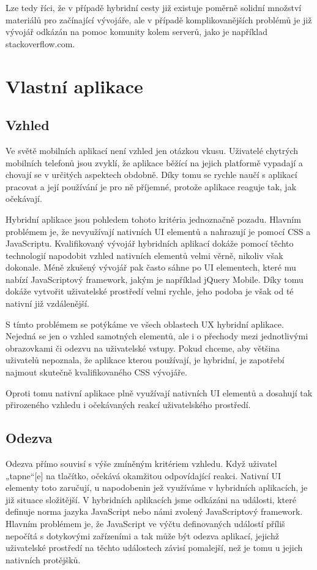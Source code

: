 Lze tedy říci, že v případě hybridní cesty již existuje poměrně solidní množství materiálů pro začínající vývojáře, ale v případě komplikovanějších problémů je již vývojář odkázán na pomoc komunity kolem serverů, jako je například stackoverflow.com.

\section{Vlastní aplikace}
\subsection{Vzhled}
Ve světě mobilních aplikací není vzhled jen otázkou vkusu. Uživatelé chytrých mobilních telefonů jsou zvyklí, že aplikace běžící na jejich platformě vypadají a chovají se v určitých aspektech obdobně. Díky tomu se rychle naučí s aplikací pracovat a její používání je pro ně příjemné, protože aplikace reaguje tak, jak očekávají.

Hybridní aplikace jsou pohledem tohoto kritéria jednoznačně pozadu. Hlavním problémem je, že nevyužívají nativních UI elementů a nahrazují je pomocí CSS a JavaScriptu. Kvalifikovaný vývojář hybridních aplikací dokáže pomocí těchto technologií napodobit vzhled nativních elementů velmi věrně, nikoliv však dokonale. Méně zkušený vývojář pak často sáhne po UI elementech, které mu nabízí JavaScriptový framework, jakým je například jQuery Mobile. Díky tomu dokáže vytvořit uživatelské prostředí velmi rychle, jeho podoba je však od té nativní již vzdálenější.

S tímto problémem se potýkáme ve všech oblastech UX hybridní aplikace. Nejedná se jen o vzhled samotných elementů, ale i o přechody mezi jednotlivými obrazovkami či odezvu na uživatelské vstupy. Pokud chceme, aby většina uživatelů nepoznala, že aplikace kterou používají, je hybridní, je zapotřebí najmout skutečně kvalifikovaného CSS vývojáře.

Oproti tomu nativní aplikace plně využívají nativních UI elementů a dosahují tak přirozeného vzhledu i očekávaných reakcí uživatelského prostředí.

\subsection{Odezva}
Odezva přímo souvisí s výše zmíněným kritériem vzhledu. Když uživatel „tapne“[e] na tlačítko, očekává okamžitou odpovídající reakci. Nativní UI elementy toto zaručují, u napodobenin jež využíváme v hybridních aplikacích, je již situace složitější. V hybridních aplikacích jsme odkázáni na události, které definuje norma jazyka JavaScript nebo námi zvolený JavaScriptový framework. Hlavním problémem je, že JavaScript ve výčtu definovaných událostí příliš nepočítá s dotykovými zařízeními a tak může být odezva aplikací, jejichž uživatelské prostředí na těchto událostech závisí pomalejší, než je tomu u jejich nativních protějšků.

